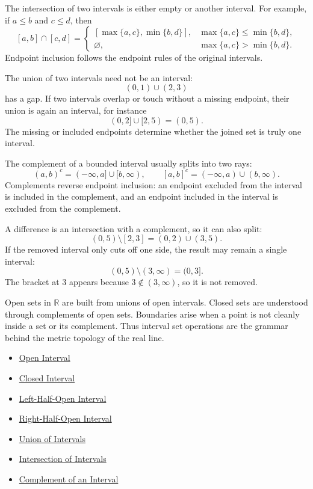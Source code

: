 \begin{remark*}[Interpretation]
The intersection of two intervals is either empty or another interval. For
example, if $a\leq b$ and $c\leq d$, then
\[
[a,b]\cap[c,d]
=
\begin{cases}
[\max\{a,c\},\min\{b,d\}], & \max\{a,c\}\leq \min\{b,d\},\\
\varnothing, & \max\{a,c\}>\min\{b,d\}.
\end{cases}
\]
Endpoint inclusion follows the endpoint rules of the original intervals.


The union of two intervals need not be an interval:
\[
(0,1)\cup(2,3)
\]
has a gap. If two intervals overlap or touch without a missing endpoint, their
union is again an interval, for instance
\[
(0,2]\cup[2,5)=(0,5).
\]
The missing or included endpoints determine whether the joined set is truly
one interval.


The complement of a bounded interval usually splits into two rays:
\[
(a,b)^c=(-\infty,a]\cup[b,\infty),
\qquad
[a,b]^c=(-\infty,a)\cup(b,\infty).
\]
Complements reverse endpoint inclusion: an endpoint excluded from the interval
is included in the complement, and an endpoint included in the interval is
excluded from the complement.


A difference is an intersection with a complement, so it can also split:
\[
(0,5)\setminus[2,3]=(0,2)\cup(3,5).
\]
If the removed interval only cuts off one side, the result may remain a single
interval:
\[
(0,5)\setminus(3,\infty)=(0,3].
\]
The bracket at $3$ appears because $3\notin(3,\infty)$, so it is not removed.


Open sets in $\mathbb{R}$ are built from unions of open intervals. Closed sets
are understood through complements of open sets. Boundaries arise when a point
is not cleanly inside a set or its complement. Thus interval set operations are
the grammar behind the metric topology of the real line.
\end{remark*}

\begin{dependencies}
\begin{itemize}
  \item \hyperref[def:open-interval]{Open Interval}
  \item \hyperref[def:closed-interval]{Closed Interval}
  \item \hyperref[def:left-half-open-interval]{Left-Half-Open Interval}
  \item \hyperref[def:right-half-open-interval]{Right-Half-Open Interval}
  \item \hyperref[def:union-of-intervals]{Union of Intervals}
  \item \hyperref[def:intersection-of-intervals]{Intersection of Intervals}
  \item \hyperref[def:complement-of-interval]{Complement of an Interval}
\end{itemize}
\end{dependencies}
